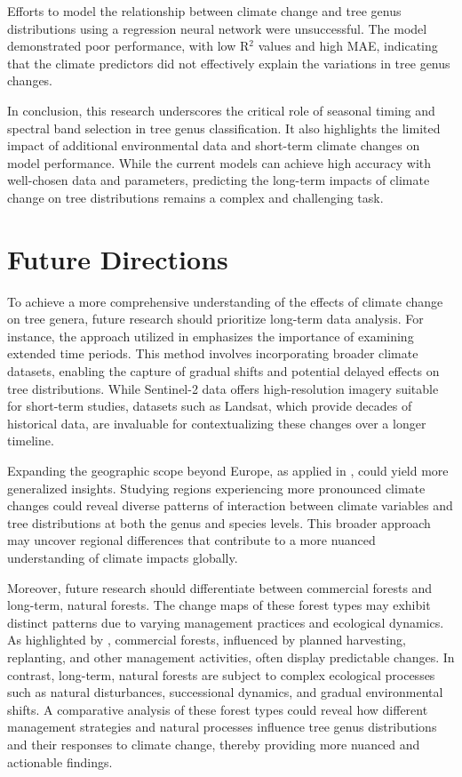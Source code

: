 Efforts to model the relationship between climate change and tree genus distributions using a regression neural network were unsuccessful. The model demonstrated poor performance, with low R$^2$ values and high MAE, indicating that the climate predictors did not effectively explain the variations in tree genus changes.

In conclusion, this research underscores the critical role of seasonal timing and spectral band selection in tree genus classification. It also highlights the limited impact of additional environmental data and short-term climate changes on model performance. While the current models can achieve high accuracy with well-chosen data and parameters, predicting the long-term impacts of climate change on tree distributions remains a complex and challenging task.

\section{Future Directions}

To achieve a more comprehensive understanding of the effects of climate change on tree genera, future research should prioritize long-term data analysis. For instance, the approach utilized in \cite{pakistan} emphasizes the importance of examining extended time periods. This method involves incorporating broader climate datasets, enabling the capture of gradual shifts and potential delayed effects on tree distributions. While Sentinel-2 data offers high-resolution imagery suitable for short-term studies, datasets such as Landsat, which provide decades of historical data, are invaluable for contextualizing these changes over a longer timeline.

Expanding the geographic scope beyond Europe, as applied in \cite{plantedforest}, could yield more generalized insights. Studying regions experiencing more pronounced climate changes could reveal diverse patterns of interaction between climate variables and tree distributions at both the genus and species levels. This broader approach may uncover regional differences that contribute to a more nuanced understanding of climate impacts globally.

Moreover, future research should differentiate between commercial forests and long-term, natural forests. The change maps of these forest types may exhibit distinct patterns due to varying management practices and ecological dynamics. As highlighted by \cite{chauvier2021}, commercial forests, influenced by planned harvesting, replanting, and other management activities, often display predictable changes. In contrast, long-term, natural forests are subject to complex ecological processes such as natural disturbances, successional dynamics, and gradual environmental shifts. A comparative analysis of these forest types could reveal how different management strategies and natural processes influence tree genus distributions and their responses to climate change, thereby providing more nuanced and actionable findings.

